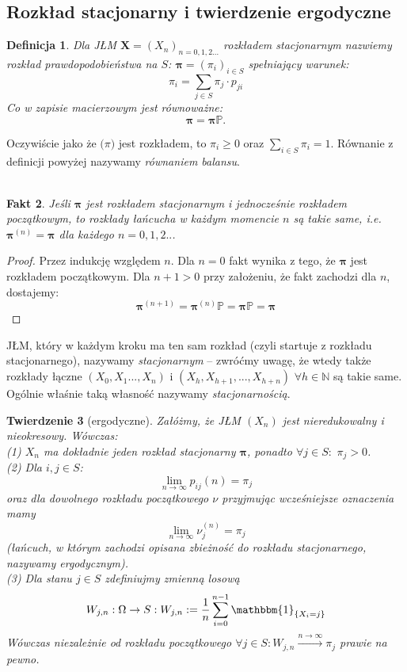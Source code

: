 \documentclass[a4paper]{article}
\theoremstyle{defn}
\newtheorem{defn}{Definicja}[subsection]
\theoremstyle{theorem}
\newtheorem{theorem}[defn]{Twierdzenie}
\theoremstyle{lemma}
\theoremstyle{cor}
\theoremstyle{fact}
\newtheorem{fact}[defn]{Fakt}
\begin{document}
\subsection{Rozkład stacjonarny i twierdzenie ergodyczne}
\label{sect2.2}
\begin{defn}\label{defn2.2.1}
Dla JŁM $\boldsymbol{X} = (X_n)_{n = 0,1,2...}$ \textit{rozkładem stacjonarnym} nazwiemy rozkład prawdopodobieństwa na $S$: $\boldsymbol{\pi} = (\pi_i)_{i \in S}$ spełniający warunek:
$$\pi_i = \sum\limits_{j \in S} \pi_j \cdot p_{ji}$$
Co w zapisie macierzowym jest równoważne:
$$\boldsymbol{\pi} = \boldsymbol{\pi} \mathbb{P}.$$
\end{defn}
Oczywiście jako że $\boldsymbol(\pi)$ jest rozkładem, to $\pi_i \geq 0$ oraz $\sum\limits_{i \in S} \pi_i = 1$. Równanie z definicji powyżej nazywamy \textit{równaniem balansu}.
\\\\
\begin{fact}\label{fact2.2.2}
Jeśli $\boldsymbol{\pi}$ jest rozkładem stacjonarnym i jednocześnie rozkładem początkowym, to rozkłady łańcucha w każdym momencie $n$ są takie same, i.e. $\boldsymbol{\pi}^{(n)} = \boldsymbol{\pi}$ dla każdego $n = 0,1,2..$.
\end{fact}
\begin{proof}
Przez indukcję względem $n$. Dla $n = 0$ fakt wynika z tego, że $\boldsymbol{\pi}$ jest rozkładem początkowym. Dla $n+1>0$ przy założeniu, że fakt zachodzi dla $n$, dostajemy:
$$\boldsymbol{\pi}^{(n+1)} = \boldsymbol{\pi}^{(n)} \mathbb{P} = \boldsymbol{\pi} \mathbb{P} = \boldsymbol{\pi}$$
\end{proof}
JŁM, który w każdym kroku ma ten sam rozkład (czyli startuje z rozkładu stacjonarnego), nazywamy \textit{stacjonarnym} – zwróćmy uwagę, że wtedy także rozkłady łączne $(X_0, X_1 ..., X_n)$ i $(X_h, X_{h+1}, ..., X_{h+n})$ $\forall h \in \mathbb{N}$ są takie same. Ogólnie właśnie taką własność nazywamy \textit{stacjonarnością}.
\\
\begin{theorem}[ergodyczne]\label{theorem2.2.3}
Załóżmy, że JŁM $(X_n)$ jest nieredukowalny i nieokresowy. Wówczas:\\
(1) $X_n$ ma dokładnie jeden rozkład stacjonarny $\boldsymbol{\pi}$, ponadto $\forall j \in S:\,\, \pi_j > 0$.
\\
(2) Dla $i,j \in S$: $$\lim\limits_{n \to \infty} p_{ij}(n) = \pi_j$$ oraz dla dowolnego rozkładu początkowego $\nu$ przyjmując wcześniejsze oznaczenia mamy $$\lim\limits_{n \to \infty} \nu_j^{(n)} = \pi_j$$ (łańcuch, w którym zachodzi opisana zbieżność do rozkładu stacjonarnego, nazywamy ergodycznym).
\\
(3) Dla stanu $j \in S$ zdefiniujmy zmienną losową $$W_{j,n}: \Omega \rightarrow S: W_{j,n} :=  \frac{1}{n} \sum\limits_{i = 0}^{n-1} \mathbbm{1}_{\{X_i = j\}}$$
Wówczas niezależnie od rozkładu początkowego $\forall j \in S: W_{j,n} \xrightarrow{{n \rightarrow \infty}} \pi_j$ prawie na pewno.
\end{theorem}
\end{document}
